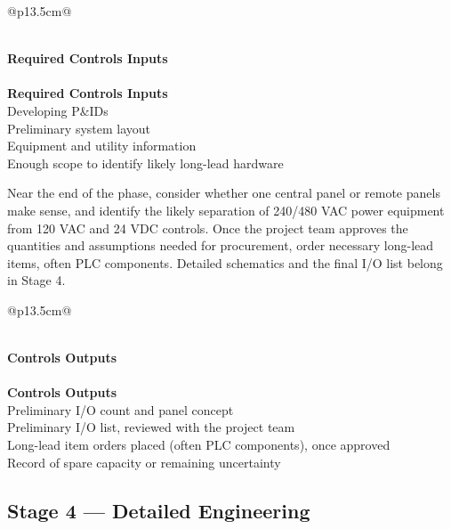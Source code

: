 \begin{longtable}{@{}p{13.5cm}@{}}
\caption{Stage 3 --- Required Controls Inputs}\label{tab:stage3-inputs} \\
\toprule
{}\textbf{Required Controls Inputs} \\
\midrule
\endfirsthead
{} \\
\toprule
{}\textbf{Required Controls Inputs} \\
\midrule
\endhead
Developing P\&IDs \\
Preliminary system layout \\
Equipment and utility information \\
Enough scope to identify likely long-lead hardware \\
\bottomrule
\end{longtable}

Near the end of the phase, consider whether one central panel or remote panels make sense, and identify the likely separation of 240/480 VAC power equipment from 120 VAC and 24 VDC controls. Once the project team approves the quantities and assumptions needed for procurement, order necessary long-lead items, often PLC components. Detailed schematics and the final I/O list belong in Stage 4.

\begin{longtable}{@{}p{13.5cm}@{}}
\caption{Stage 3 --- Controls Outputs}\label{tab:stage3-outputs} \\
\toprule
{}\textbf{Controls Outputs} \\
\midrule
\endfirsthead
{} \\
\toprule
{}\textbf{Controls Outputs} \\
\midrule
\endhead
Preliminary I/O count and panel concept \\
Preliminary I/O list, reviewed with the project team \\
Long-lead item orders placed (often PLC components), once approved \\
Record of spare capacity or remaining uncertainty \\
\bottomrule
\end{longtable}

\subsection{Stage 4 --- Detailed Engineering}\label{sec:stage4}

